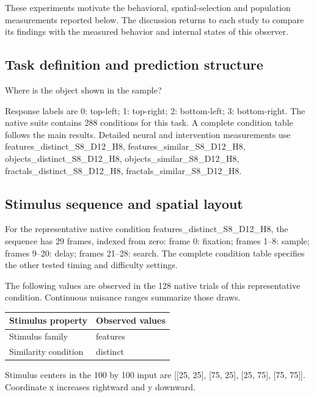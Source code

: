 \documentclass[11pt]{article}
\begin{document}
These experiments motivate the behavioral, spatial-selection and population measurements reported below. The discussion returns to each study to compare its findings with the measured behavior and internal states of this observer.
\subsection{Task definition and prediction structure}
Where is the object shown in the sample?

Response labels are 0: top-left; 1: top-right; 2: bottom-left; 3: bottom-right. The native suite contains 288 conditions for this task. A complete condition table follows the main results. Detailed neural and intervention measurements use features\_\allowbreak{}distinct\_\allowbreak{}S8\_\allowbreak{}D12\_\allowbreak{}H8, features\_\allowbreak{}similar\_\allowbreak{}S8\_\allowbreak{}D12\_\allowbreak{}H8, objects\_\allowbreak{}distinct\_\allowbreak{}S8\_\allowbreak{}D12\_\allowbreak{}H8, objects\_\allowbreak{}similar\_\allowbreak{}S8\_\allowbreak{}D12\_\allowbreak{}H8, fractals\_\allowbreak{}distinct\_\allowbreak{}S8\_\allowbreak{}D12\_\allowbreak{}H8, fractals\_\allowbreak{}similar\_\allowbreak{}S8\_\allowbreak{}D12\_\allowbreak{}H8.

\subsection{Stimulus sequence and spatial layout}
For the representative native condition features\_\allowbreak{}distinct\_\allowbreak{}S8\_\allowbreak{}D12\_\allowbreak{}H8, the sequence has 29 frames, indexed from zero: frame 0: fixation; frames 1--8: sample; frames 9--20: delay; frames 21--28: search. The complete condition table specifies the other tested timing and difficulty settings.

The following values are observed in the 128 native trials of this representative condition. Continuous nuisance ranges summarize those draws.
\begin{center}\small\begin{tabular}{p{}p{}}\toprule Stimulus property & Observed values\\\midrule
Stimulus family & features\\
Similarity condition & distinct\\
\bottomrule\end{tabular}\normalsize\end{center}
Stimulus centers in the 100 by 100 input are [[25, 25], [75, 25], [25, 75], [75, 75]]. Coordinate x increases rightward and y downward.
\end{document}
